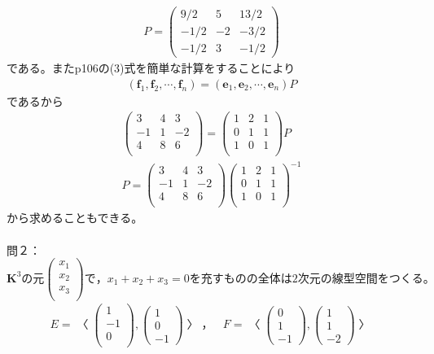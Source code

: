 \documentclass[dvipdfmx,uplatex,11pt]{jsarticle}
\begin{document}
\begin{eqnarray*}
P=
\begin{pmatrix}
9/2 & 5  & 13/2 \\
-1/2 & -2 & -3/2 \\
-1/2 & 3 & -1/2
\end{pmatrix}
\end{eqnarray*}
である。またp106の(3)式を簡単な計算をすることにより
\begin{eqnarray*}
(\bm{f}_1,\bm{f}_2,\cdots ,\bm{f}_n)=(\bm{e}_1,\bm{e}_2,\cdots ,\bm{e}_n)P
\end{eqnarray*}
であるから
\begin{eqnarray*}
\begin{pmatrix}
3 & 4 & 3 \\
-1 & 1 & -2 \\
4 & 8 & 6 \\
\end{pmatrix}
=
\begin{pmatrix}
1 & 2 & 1 \\
0 & 1 & 1 \\
1 & 0 & 1 \\
\end{pmatrix}
P \\ 
%
%
%
P=
\begin{pmatrix}
3 & 4 & 3 \\
-1 & 1 & -2 \\
4 & 8 & 6 \\
\end{pmatrix}
\begin{pmatrix}
1 & 2 & 1 \\
0 & 1 & 1 \\
1 & 0 & 1 \\
\end{pmatrix}
^{-1}
\end{eqnarray*}
から求めることもできる。\\ \\
問２：$\bm{K}^3の元
\begin{pmatrix}
x_1 \\
x_2 \\
x_3 \\
\end{pmatrix}
で，x_1+x_2+x_3=0を充すものの全体は2次元の線型空間をつくる。
$
\begin{eqnarray*}
E=〈
\begin{pmatrix}
1 \\
-1 \\
0 \\
\end{pmatrix}
,
\begin{pmatrix}
1 \\
0 \\
-1
\end{pmatrix}
〉，~~~~F=〈
\begin{pmatrix}
0 \\
1 \\
-1
\end{pmatrix}
,
\begin{pmatrix}
1 \\
1 \\
-2
\end{pmatrix}
〉
\end{eqnarray*}
\end{document}
